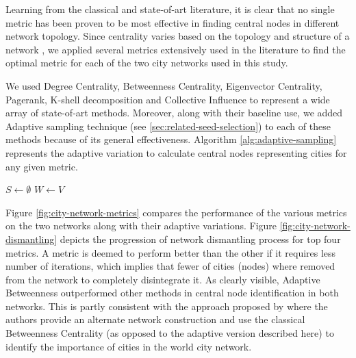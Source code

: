 			Learning from the classical and state-of-art literature, it is clear that no single metric has been proven to be most effective in finding central nodes in different network topology. Since centrality varies based on the topology and structure of a network \cite{hashmi2012,hussain2013a,malighetti2019}, we applied several metrics extensively used in the literature to find the optimal metric for each of the two city networks used in this study.
		
			We used Degree Centrality, Betweenness Centrality, Eigenvector Centrality, Pagerank, K-shell decomposition and Collective Influence to represent a wide array of state-of-art methods. Moreover, along with their baseline use, we added Adaptive sampling technique (see \ref{sec:related-seed-selection}) to each of these methods because of its general effectiveness. Algorithm \ref{alg:adaptive-sampling} represents the adaptive variation to calculate central nodes representing cities for any given metric.
			
			\begin{algorithm}
				\caption{Adaptive variation \cite{lipton1989} to calculate central cities using certain metric}
				\label{alg:adaptive-sampling}
				$S\gets \emptyset$
				\newline
				$W\gets V$
			\end{algorithm}
		
			Figure \ref{fig:city-network-metrics} compares the performance of the various metrics on the two networks along with their adaptive variations. Figure \ref{fig:city-network-dismantling} depicts the progression of network dismantling process for top four metrics. A metric is deemed to perform better than the other if it requires less number of iterations, which implies that fewer of cities (nodes) where removed from the network to completely disintegrate it. As clearly visible, Adaptive Betweenness outperformed other methods in central node identification in both networks. This is partly consistent with the approach proposed by \cite{henderson2002} where the authors provide an alternate network construction and use the classical Betweenness Centrality (as opposed to the adaptive version described here) to identify the importance of cities in the world city network.
			

